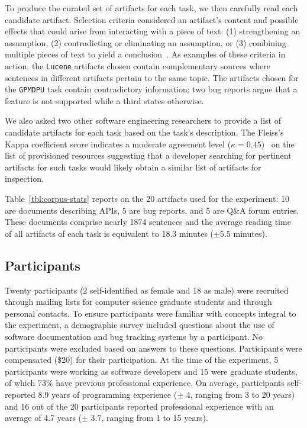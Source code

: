 To produce the curated set of artifacts for each task, we then carefully read each candidate artifact.
Selection criteria considered an artifact's content and possible effects that 
could arise from interacting with a piece of text:
(1) strengthening an assumption, (2) contradicting or eliminating an assumption, or 
(3) combining multiple pieces of text to yield a conclusion~\cite{clark2013relevance}.
As examples of these criteria in action, the \texttt{Lucene}
artifacts chosen contain
complementary sources where sentences in different artifacts
pertain to the same topic.  
The artifacts chosen for
the \texttt{GPMDPU} task contain contradictory information; two bug reports
argue that a feature is not supported while a third states otherwise.

We also asked two other software engineering researchers to provide a
list of candidate artifacts for each task based on the task's
description.  The Fleiss's Kappa coefficient score indicates a
moderate agreement level ($\kappa = 0.45$)~\cite{fleisskappa1977,
fleiss1981} on the list of provisioned resources suggesting that a
developer searching for pertinent artifacts for such tasks would
likely obtain a similar list of artifacts for inspection.



Table~\ref{tbl:corpus-stats} reports on the 20 artifacts used for the
experiment: 10 are documents describing APIs, 5 are bug reports, and 5
are Q\&A forum entries. These documents comprise nearly 1874
sentences and the average reading time~\cite{Just1980} of all artifacts of each task
is equivalent to 18.3 minutes ($\pm 5.5$ minutes). 








\subsection{Participants}
\label{cp3:method-participants}


Twenty participants (2 self-identified as female and 18 as male) were recruited through
mailing lists for computer science graduate students 
and through personal contacts. To ensure participants were
familiar with concepts integral to the experiment, a demographic
survey included questions about the use of software documentation and
bug tracking systems by a participant.  No participants were excluded
based on answers to these questions.
Participants were compensated (\$20) for their participation.
At the time of the experiment, 5 participants were working as software
developers and 15 were graduate
students, of which 73\% have
previous professional experience. 
On average, participants self-reported 8.9 years of
programming experience ({\small $\pm$} 4, ranging from 3 to 20 years)
and 16 out of the 20 participants reported professional experience with an average of 4.7 years ({\small $\pm$}
3.7, ranging from 1 to 15 years).



